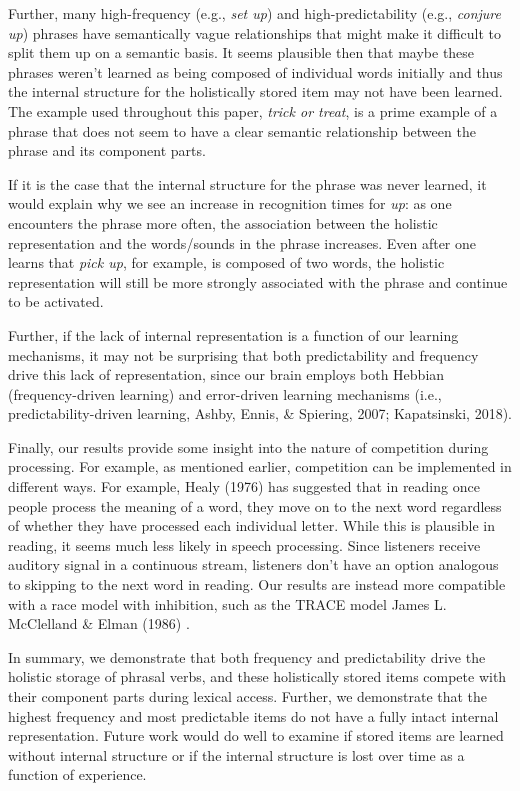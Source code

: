 \documentclass[
  man,floatsintext]{apa6}
\begin{document}
Further, many high-frequency (e.g., \emph{set up}) and high-predictability (e.g., \emph{conjure up}) phrases have semantically vague relationships that might make it difficult to split them up on a semantic basis. It seems plausible then that maybe these phrases weren't learned as being composed of individual words initially and thus the internal structure for the holistically stored item may not have been learned. The example used throughout this paper, \emph{trick or treat}, is a prime example of a phrase that does not seem to have a clear semantic relationship between the phrase and its component parts.

If it is the case that the internal structure for the phrase was never learned, it would explain why we see an increase in recognition times for \emph{up}: as one encounters the phrase more often, the association between the holistic representation and the words/sounds in the phrase increases. Even after one learns that \emph{pick up}, for example, is composed of two words, the holistic representation will still be more strongly associated with the phrase and continue to be activated.

Further, if the lack of internal representation is a function of our learning mechanisms, it may not be surprising that both predictability and frequency drive this lack of representation, since our brain employs both Hebbian (frequency-driven learning) and error-driven learning mechanisms (i.e., predictability-driven learning, Ashby, Ennis, \& Spiering, 2007; Kapatsinski, 2018).

Finally, our results provide some insight into the nature of competition during processing. For example, as mentioned earlier, competition can be implemented in different ways. For example, Healy (1976) has suggested that in reading once people process the meaning of a word, they move on to the next word regardless of whether they have processed each individual letter. While this is plausible in reading, it seems much less likely in speech processing. Since listeners receive auditory signal in a continuous stream, listeners don't have an option analogous to skipping to the next word in reading. Our results are instead more compatible with a race model with inhibition, such as the TRACE model James L. McClelland \& Elman (1986) .

In summary, we demonstrate that both frequency and predictability drive the holistic storage of phrasal verbs, and these holistically stored items compete with their component parts during lexical access. Further, we demonstrate that the highest frequency and most predictable items do not have a fully intact internal representation. Future work would do well to examine if stored items are learned without internal structure or if the internal structure is lost over time as a function of experience.
\end{document}
